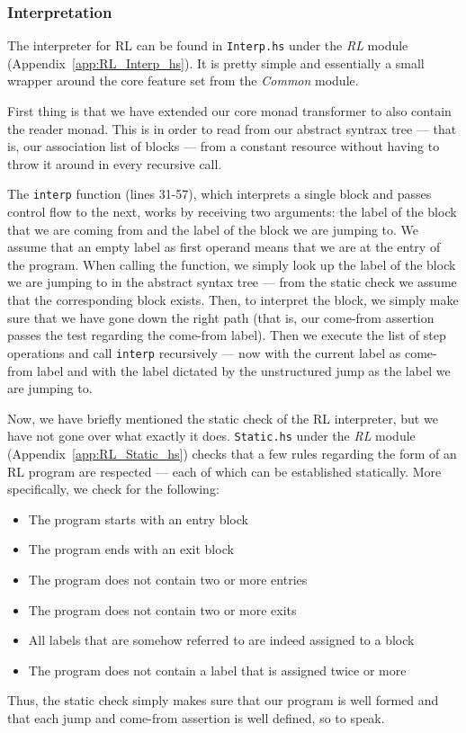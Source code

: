 \subsubsection{Interpretation}
The interpreter for RL can be found in \texttt{Interp.hs} under the \textit{RL} module (Appendix~\ref{app:RL_Interp_hs}). It is pretty simple and essentially a small wrapper around the core feature set from the \textit{Common} module.

First thing is that we have extended our core monad transformer to also contain the reader monad. This is in order to read from our abstract syntrax tree --- that is, our association list of blocks --- from a constant resource without having to throw it around in every recursive call.

The \texttt{interp} function (lines 31-57), which interprets a single block and passes control flow to the next, works by receiving two arguments: the label of the block that we are coming from and the label of the block we are jumping to. We assume that an empty label as first operand means that we are at the entry of the program. When calling the function, we simply look up the label of the block we are jumping to in the abstract syntax tree --- from the static check we assume that the corresponding block exists. Then, to interpret the block, we simply make sure that we have gone down the right path (that is, our come-from assertion passes the test regarding the come-from label). Then we execute the list of step operations and call \texttt{interp} recursively --- now with the current label as come-from label and with the label dictated by the unstructured jump as the label we are jumping to.

Now, we have briefly mentioned the static check of the RL interpreter, but we have not gone over what exactly it does. \texttt{Static.hs} under the \textit{RL} module (Appendix~\ref{app:RL_Static_hs}) checks that a few rules regarding the form of an RL program are respected --- each of which can be established statically. More specifically, we check for the following:
\begin{itemize}
  \item The program starts with an entry block
  \item The program ends with an exit block
  \item The program does not contain two or more entries
  \item The program does not contain two or more exits
  \item All labels that are somehow referred to are indeed assigned to a block
  \item The program does not contain a label that is assigned twice or more
\end{itemize}
Thus, the static check simply makes sure that our program is well formed and that each jump and come-from assertion is well defined, so to speak.

